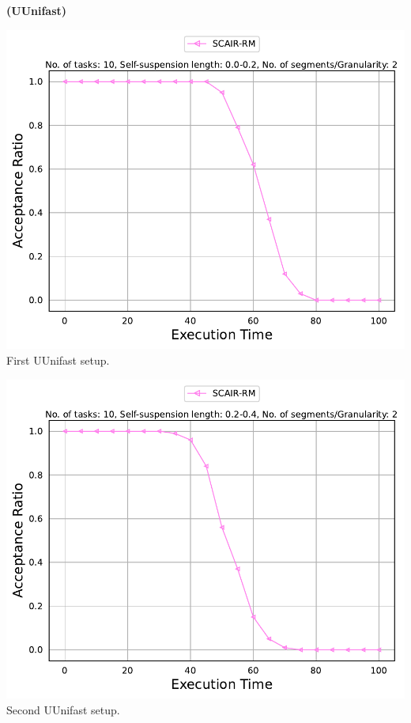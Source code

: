 \documentclass[]{article}
\begin{document}
	\begin{minipage}[t]{0.48\linewidth}
		\centering
		\textbf{(UUnifast)}
		\vspace{0.3cm}
		
		\includegraphics[width=\linewidth]{SCAIR-RM[2][0.0-0.2][10].pdf}
		First UUnifast setup.
		\vspace{0.3cm}
		
		\includegraphics[width=\linewidth]{SCAIR-RM[2][0.2-0.4][10].pdf}
		Second UUnifast setup.
		\vspace{0.3cm}


\end{minipage}
\end{document}
